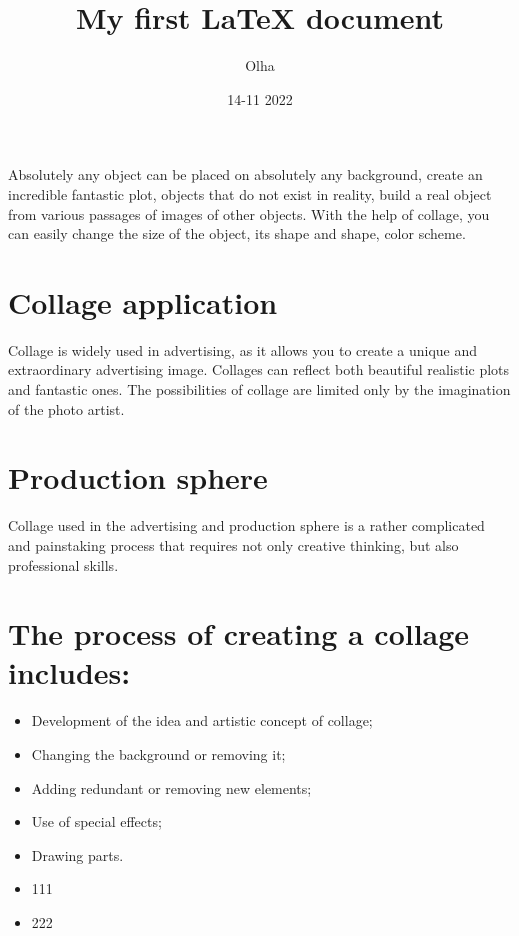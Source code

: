 \documentclass{article}
\title{My first LaTeX document}	\author{Olha}
\date{14-11 2022}
\begin{document}
	\maketitle
	\newpage
Absolutely any object can be placed on absolutely any background, create an incredible fantastic plot, objects that do not exist in reality, build a real object from various passages of images of other objects. With the help of collage, you can easily change the size of the object, its shape and shape, color scheme.

\section*{Collage application} 


Collage is widely used in advertising, as it allows you to create a unique and extraordinary advertising image. Collages can reflect both beautiful realistic plots and fantastic ones. The possibilities of collage are limited only by the imagination of the photo artist.

\section {Production sphere}

Collage used in the advertising and production sphere is a rather complicated and painstaking process that requires not only creative thinking, but also professional skills.
\section {The process of creating a collage includes:}
\begin{itemize}
	\item Development of the idea and artistic concept of collage;
	\item Changing the background or removing it;
	\item Adding redundant or removing new elements;
	\item Use of special effects;
	\item Drawing parts.
	\item 111
	\item 222
\end{itemize}
\end{document}
